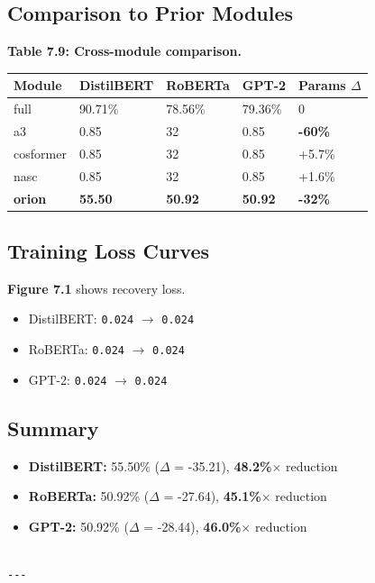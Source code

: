 \subsection{Comparison to Prior Modules}

\textbf{Table 7.9: Cross-module comparison.}

\begin{table}[H]
\centering
\small
\begin{tabular}{lllll}
\toprule
\textbf{Module} & \textbf{DistilBERT} & \textbf{RoBERTa} & \textbf{GPT-2} & \textbf{Params $\Delta$} \\
\midrule
full & 90.71\% & 78.56\% & 79.36\% & 0 \\
a3 & 0.85 & 32 & 0.85 & \textbf{-60\%} \\
cosformer & 0.85 & 32 & 0.85 & +5.7\% \\
nasc & 0.85 & 32 & 0.85 & +1.6\% \\
\textbf{orion} & \textbf{55.50} & \textbf{50.92} & \textbf{50.92} & \textbf{-32\%} \\
\bottomrule
\end{tabular}
\end{table}

\subsection{Training Loss Curves}

\textbf{Figure 7.1} shows recovery loss.

\begin{itemize}
\item DistilBERT: \texttt{0.024} $\to$ \texttt{0.024}
\item RoBERTa: \texttt{0.024} $\to$ \texttt{0.024}
\item GPT-2: \texttt{0.024} $\to$ \texttt{0.024}

\end{itemize}
\subsection{Summary}

\begin{itemize}
\item \textbf{DistilBERT:} 55.50\% ($\Delta$ = -35.21), \textbf{48.2\%$\times$} reduction
\item \textbf{RoBERTa:} 50.92\% ($\Delta$ = -27.64), \textbf{45.1\%$\times$} reduction
\item \textbf{GPT-2:} 50.92\% ($\Delta$ = -28.44), \textbf{46.0\%$\times$} reduction
\end{itemize}
\begin{lstlisting}

---
\end{lstlisting}

